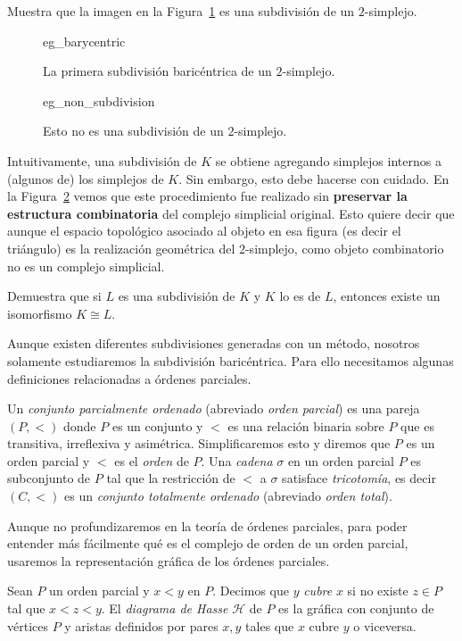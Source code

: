 \documentclass{standalone}
\begin{document}
	\begin{exercise}
		Muestra que la imagen en la Figura~\ref{fig:eg_barycentric} es una subdivisión de un $2$-simplejo.
	\end{exercise}
	
	\begin{figure}
		\centering
		{eg_barycentric}
		\caption{La primera subdivisión baricéntrica de un $2$-simplejo.}
		\label{fig:eg_barycentric}
	\end{figure}
	
	\begin{figure}
		\centering
		{eg_non_subdivision}
		\caption{Esto no es una subdivisión de un $2$-simplejo.}
		\label{fig:eg_non_subdivision}
	\end{figure}
	
	Intuitivamente, una subdivisión de $K$ se obtiene agregando simplejos internos a (algunos de) los simplejos de $K$. Sin embargo, esto debe hacerse con cuidado. En la Figura~\ref{fig:eg_non_subdivision} vemos que este procedimiento fue realizado sin \textbf{preservar la estructura combinatoria} del complejo simplicial original. Esto quiere decir que aunque el espacio topológico asociado al objeto en esa figura (es decir el triángulo) es la realización geométrica del $2$-simplejo, como objeto combinatorio no es un complejo simplicial. 
	
	\begin{exercise}
		Demuestra que si $L$ es una subdivisión de $K$ y $K$ lo es de $L$, entonces existe un isomorfismo $K\cong L$.
	\end{exercise}

	Aunque existen diferentes subdivisiones generadas con un método, nosotros solamente estudiaremos la subdivisión baricéntrica. Para ello necesitamos algunas definiciones relacionadas a órdenes parciales.
	
	\begin{definition}\label{defn:poset}
		Un \emph{conjunto parcialmente ordenado} (abreviado \emph{orden parcial}) es una pareja $(P,<)$ donde $P$ es un conjunto y $<$ es una relación binaria sobre $P$ que es transitiva, irreflexiva y asimétrica. Simplificaremos esto y diremos que $P$ es un orden parcial y $<$ es el \emph{orden} de $P$. Una \emph{cadena} $\sigma$ en un orden parcial $P$ es subconjunto de $P$ tal que la restricción de $<$ a $
		\sigma$ satisface \emph{tricotomía}, es decir $(C,<)$ es un \emph{conjunto totalmente ordenado} (abreviado \emph{orden total}).
	\end{definition}
	Aunque no profundizaremos en la teoría de órdenes parciales, para poder entender más fácilmente qué es el complejo de orden de un orden parcial, usaremos la representación gráfica de los órdenes parciales. 
	\begin{definition}\label{defn:Hasse}
		Sean $P$ un orden parcial y $x<y$ en $P$. Decimos que $y$ \emph{cubre} $x$ si no existe $z\in P$ tal que $x<z<y$. El \emph{diagrama de Hasse} $\mathcal{H}$ de $P$ es la gráfica con conjunto de vértices $P$ y aristas definidos por pares ${x,y}$ tales que $x$ cubre $y$ o viceversa.
	\end{definition}
	
\end{document}
